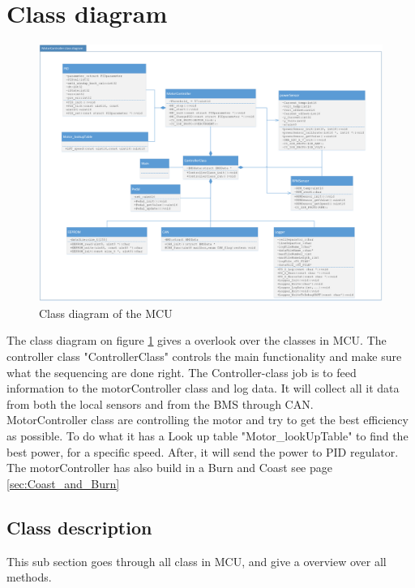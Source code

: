 \newpage
\section{Class diagram}
\label{sec:class_diagram}

\begin{figure}[H]
	\centering
	\includegraphics [width=6in]{Software/Pictures/class-diagram.png}
	\caption{Class diagram of the MCU}
	\label{fig:Class_diagram_MCU}
\end{figure}

The class diagram on figure \ref{fig:Class_diagram_MCU} gives a overlook over the classes in MCU. The controller class "ControllerClass" controls the main functionality and make sure what the sequencing are done right. The Controller-class job is to feed information to the motorController class and log data. It will collect all it data from both the local sensors and from the BMS through CAN.\\
MotorController class are controlling the motor and try to get the best efficiency as possible. To do what it has a Look up table "Motor\_lookUpTable" to find the best power, for a specific speed. After, it will send the power to PID regulator. The motorController has also build in a Burn and Coast see page \vref{sec:Coast_and_Burn}

\subsection{Class description}

This sub section goes through all class in MCU, and give a overview over all methods.
